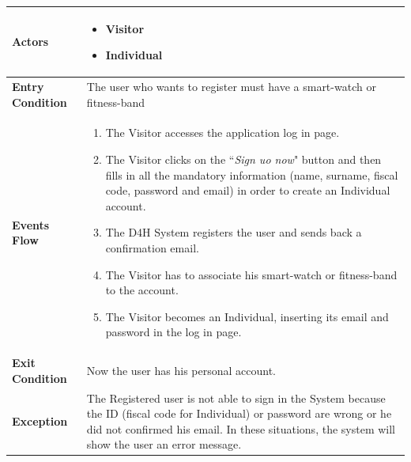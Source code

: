             \begin{table}[H]
            
            	\centering
                
                \begin{tabular}{|p{3cm}|p{8.2cm}|}
                    \hline
                    \textbf{Actors} & \begin{itemize}
                                          \item Visitor
                                          \item Individual
                                      \end{itemize} \\
                     \hline
                    \textbf{Entry Condition} & The user who wants to register must have a smart-watch or fitness-band\\
                     \hline
                    \textbf{Events Flow} & \begin{enumerate}
                                                \item The Visitor accesses the application log in page.
                                                \item The Visitor clicks on the ``\emph{Sign uo now}" button and then fills in all the mandatory information (name, surname, fiscal code, password and email) in order to create an Individual account.
                                                \item The D4H System registers the user and sends back a confirmation email.
                                                \item The Visitor has to associate his smart-watch or fitness-band to the account.
                                                \item The Visitor becomes an Individual, inserting its email and password in the log in page.
                                            \end{enumerate}\\
                     \hline
                    \textbf{Exit Condition} & Now the user has his personal account.\\
                     \hline
                    \textbf{Exception} & The Registered user is not able to sign in the System because the ID (fiscal code for Individual) or password are wrong or he did not confirmed his email. In these situations, the system will show the user an error message.\\
                     \hline
                \end{tabular}  
            \end{table}
            
